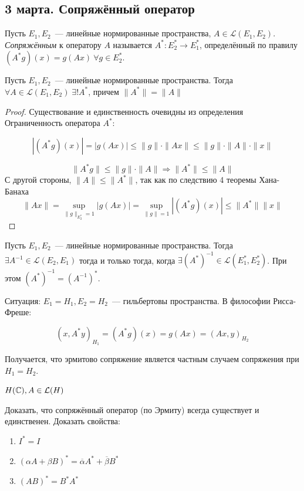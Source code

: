 \subsection{3 марта. Сопряжённый оператор}

\begin{definition}
Пусть $E_1, E_2$~--- линейные нормированные пространства,
$A \in \mathcal{L}(E_1, E_2)$. \textit{Сопряжённым} к оператору $A$ называется
$A^*: E_2^* \to E_1^*$, определённый по правилу
$(A^* g)(x) = g(A x) \ \forall g \in E_2^*$.  
\end{definition}



\begin{theorem}[9.1]
    Пусть $E_1, E_2$~--- линейные нормированные пространства. Тогда $\forall A \in \mathcal{L}(E_1, E_2) \; \exists ! A^*$, причем $\| A^* \| =\| A\|$
\end{theorem}
\begin{proof}
    Существование и единственность очевидны из определения
    Ограниченность оператора $A^*$:

    \[
    |(A^*g)(x)| = |g(Ax)| \leqslant \|g\| \cdot \|Ax\| \leqslant
    \|g\| \cdot \|A\| \cdot \|x\|
    \]
    
    \[
    \|A^* g\| \leqslant \|g\| \cdot \|A\| \Rightarrow
    \|A^*\| \leqslant \|A\|
    \]
    С другой стороны, $\|A\| \leqslant \|A^*\|$, так как по следствию 4 теоремы Хана-Банаха
    \[ \| Ax\| = \sup_{\|g\|_{E_2^*} = 1} |g(Ax)| = 
    \sup_{\|g\|=1} |(A^*g)(x)| \leqslant \|A^*\| \|x\|\]
\end{proof}

\begin{theorem}[9.3 (б/д)]
Пусть $E_1, E_2$~--- линейные нормированные пространства. Тогда
$\exists A^{-1} \in \mathcal{L}(E_2, E_1)$ тогда и только тогда, когда
$\exists (A^*)^{-1} \in \mathcal{L}(E_1^*, E_2^*)$.
При этом $(A^*)^{-1} = (A^{-1})^*$.
\end{theorem}

Ситуация: $E_1 = H_1, E_2 = H_2$~--- гильбертовы пространства.
В философии Рисса-Фреше:

\[ (x, A^*y)_{H_1}=(A^* g)(x)=g(Ax)=(Ax,y)_{H_2}\]

Получается, что эрмитово сопряжение является частным случаем сопряжения при $H_1=H_2$.

$H(\mathbb{C}), A \in \mathcal{L}(H)$

\begin{exercise}
Доказать, что сопряжённый оператор (по Эрмиту) всегда существует и единственен. Доказать свойства:

\begin{enumerate}
    \item $I^* = I$
    \item $(\alpha A + \beta B)^* = \overline{\alpha} A^* + \overline{\beta} B^*$
    \item $(AB)^* = B^* A^*$
\end{enumerate}

\end{exercise}

